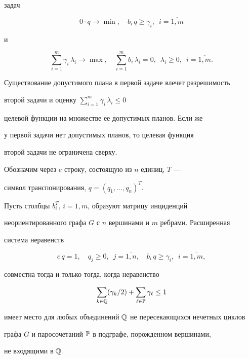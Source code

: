 задач


$$


0\cdot q\to \min,\quad b_i\,q\ge\gamma_i,\; \ i=\overline{1,m}


$$


и


$$


\sum_{i=1}^m \gamma_i\,\lambda_i\to\max,


\quad\sum_{i=1}^m b_i\,\lambda_i=0,\; \


\lambda_i\ge 0,\; \ i=\overline{1,m}.


$$


Существование допустимого плана в первой задаче влечет разрешимость


второй задачи и оценку $\sum\limits_{i=1}^m \gamma_i\,\lambda_i\le 0$


целевой функции на множестве ее допустимых планов. Если же


у первой задачи нет допустимых планов, то целевая функция


второй задачи не ограничена сверху.





Обозначим через $e$ строку, состоящую из $n$ единиц, $T$ ---


символ транспонирования, $q=(q_1,\dotsc,q_n)^T$.


\bigskip





\begin{thm}


Пусть столбцы $b_i^T,\, i=\overline{1,m}$, образуют матрицу инциденций


неориентированного графа $G$ с $n$ вершинами и $m$ ребрами. Расширенная


система неравенств


\begin{equation}


e\,q=1,\quad q_j\ge 0,\; \ j=\overline{1,n},\quad b_i\,q\ge\gamma_i,\; \


i=\overline{1,m}, %


\end{equation}


совместна тогда и только тогда, когда неравенство


\begin{equation}


\sum_{k\in \Bbb Q}(\gamma_k/2)+\sum_{\ell\in \Bbb P}\gamma_\ell\le 1 %


\end{equation}


имеет место для любых объединений $\Bbb Q$ не пересекающихся нечетных циклов


графа $G$ и паросочетаний $\Bbb P$ в подграфе, порожденном вершинами,


не входящими в $\Bbb Q$.


\end{thm}





